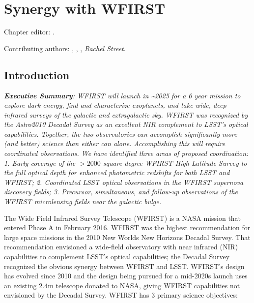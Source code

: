 \chapter[Synergy with WFIRST]{Synergy with WFIRST}
\def\chpname{wfirst}\label{chp:\chpname}

Chapter editor:
.

Contributing authors:
,
,
,
{\it Rachel Street}.


\section{Introduction}
\label{sec:wfirst:intro}


\emph{\textbf{Executive Summary}:
WFIRST will launch in \sim 2025 for a 6 year mission to explore dark energy, find and characterize exoplanets, and take wide, deep infrared surveys of the galactic and extragalactic sky.  WFIRST was recognized by the Astro2010 Decadal Survey as an excellent NIR complement to LSST's optical capabilities.  Together, the two observatories can accomplish significantly more (and better) science than either can alone. Accomplishing this will require coordinated observations.  We have identified three areas of proposed coordination: 1. Early coverage of the $>2000$ square degree WFIRST High Latitude Survey to the full optical depth for enhanced photometric redshifts for both LSST and WFIRST; 2. Coordinated LSST optical observations in the WFIRST supernova discovery fields; 3. Precursor, simultaneous, and follow-up observations of the WFIRST microlensing fields near the galactic bulge. }




The Wide Field Infrared Survey Telescope (WFIRST) is a NASA mission that
entered Phase A in February 2016.  WFIRST was the highest recommendation
for large space missions in the 2010 New Worlds New Horizons Decadal
Survey.  That recommendation envisioned a wide-field observatory with
near infrared (NIR) capabilities to complement LSST's optical
capabilities; the Decadal Survey recognized the obvious synergy between
WFIRST and LSST.  WFIRST's design has evolved since 2010 and the design
being pursued for a mid-2020s launch uses an existing $2.4$m telescope
donated to NASA, giving WFIRST capabilities not envisioned by the
Decadal Survey.  WFIRST has 3 primary science objectives:

